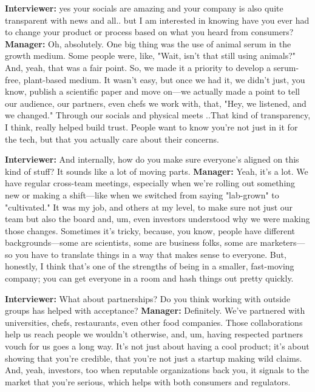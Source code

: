 \textbf{Interviewer:} yes your socials are amazing and your company is also quite transparent with news and all.. but I am interested in knowing have you ever had to change your product or process based on what you heard from consumers? \newline
\textbf{Manager:} Oh, absolutely. One big thing was the use of animal serum in the growth medium. Some people were, like, "Wait, isn't that still using animals?" And, yeah, that was a fair point. So, we made it a priority to develop a serum-free, plant-based medium. It wasn't easy, but once we had it, we didn't just, you know, publish a scientific paper and move on—we actually made a point to tell our audience, our partners, even chefs we work with, that, "Hey, we listened, and we changed."  Through our socials and physical meets ..That kind of transparency, I think, really helped build trust. People want to know you're not just in it for the tech, but that you actually care about their concerns. \newline

\textbf{Interviewer:} And internally, how do you make sure everyone's aligned on this kind of stuff? It sounds like a lot of moving parts. \newline
\textbf{Manager:} Yeah, it's a lot. We have regular cross-team meetings, especially when we're rolling out something new or making a shift—like when we switched from saying "lab-grown" to "cultivated." It was my job, and others at my level, to make sure not just our team but also the board and, um, even investors understood why we were making those changes. Sometimes it's tricky, because, you know, people have different backgrounds—some are scientists, some are business folks, some are marketers—so you have to translate things in a way that makes sense to everyone. But, honestly, I think that's one of the strengths of being in a smaller, fast-moving company; you can get everyone in a room and hash things out pretty quickly. \newline

\textbf{Interviewer:} What about partnerships? Do you think working with outside groups has helped with acceptance? \newline
\textbf{Manager:} Definitely. We've partnered with universities, chefs, restaurants, even other food companies. Those collaborations help us reach people we wouldn't otherwise, and, um, having respected partners vouch for us goes a long way. It's not just about having a cool product; it's about showing that you're credible, that you're not just a startup making wild claims. And, yeah, investors, too when reputable organizations back you, it signals to the market that you're serious, which helps with both consumers and regulators. \newline

